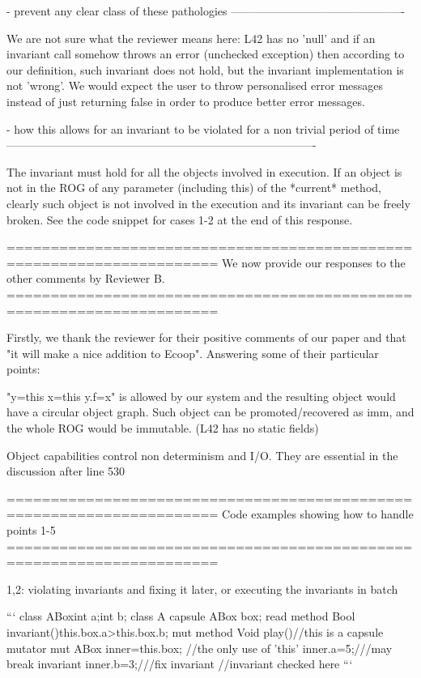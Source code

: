 - prevent any clear class of these pathologies
----------------------------------------------

We are not sure what the reviewer means here: L42 has no 'null' and if an invariant call
somehow throws an error (unchecked exception) then according to our definition,
such invariant does not hold, but the invariant implementation is not 'wrong'.
We would expect the user to throw personalised error messages instead of just returning false
in order to produce better error messages.

- how this allows for an invariant to be violated for a non trivial period of time
----------------------------------------------------------------------------------

The invariant must hold for all the objects involved in execution.
If an object is not in the ROG of any parameter (including this) of the *current* method,
clearly such object is not involved in the execution and its invariant can be freely broken.
See the code snippet for cases 1-2 at the end of this response.


======================================================================
We now provide our responses to the other comments by Reviewer B.
======================================================================

Firstly, we thank the reviewer for their positive comments of our paper and that "it will make a nice addition to Ecoop".
Answering some of their particular points: 

"y=this x=this y.f=x" is allowed by our system and the resulting object would have a circular object graph.
Such object can be promoted/recovered as imm, and the whole ROG would be immutable.
(L42 has no static fields)

Object capabilities control non determinism and I/O. They are essential in the discussion after line 530


======================================================================
Code examples showing how to handle points 1-5
======================================================================

1,2: violating invariants and fixing it later, or executing the invariants in batch

```
  class ABox{int a;int b;}
  class A{
    capsule ABox box;
    read method Bool invariant(){this.box.a>this.box.b;}
    mut method Void play(){//this is a capsule mutator
      mut ABox inner=this.box; //the only use of 'this'
      inner.a=5;///may break invariant
      inner.b=3;///fix invariant
      //invariant checked here
    }
  }
```

